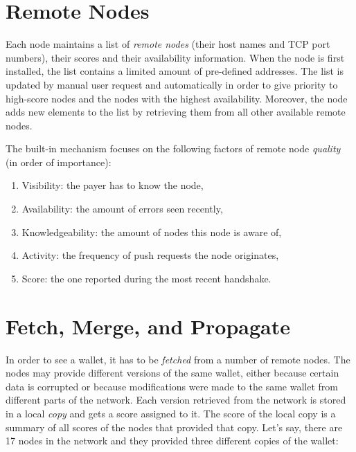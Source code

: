 \documentclass[11pt,oneside]{article}
\begin{document}
\section{Remote Nodes}\label{sec:remotes}

Each node maintains a list of \emph{remote nodes} (their host names and TCP port numbers),
their scores and their availability information. When the node is first installed,
the list contains a limited amount of pre-defined addresses. The list is
updated by manual user request and automatically in order to give priority
to high-score nodes and the nodes with the highest availability.
Moreover, the node adds new elements to the list by retrieving them from all other
available remote nodes.

The built-in mechanism focuses on the following factors of
remote node \emph{quality} (in order of importance):

\begin{enumerate}
  \item Visibility: the payer has to know the node,
  \item Availability: the amount of errors seen recently,
  \item Knowledgeability: the amount of nodes this node is aware of,
  \item Activity: the frequency of push requests the node originates,
  \item Score: the one reported during the most recent handshake.
\end{enumerate}

\section{Fetch, Merge, and Propagate}\label{sec:fetch}

In order to see a wallet, it has to be \emph{fetched} from a number of remote
nodes. The nodes may provide different versions of the same wallet, either
because certain data is corrupted or because modifications were made to the same
wallet from different parts of the network. Each version retrieved from the
network is stored in a local \emph{copy} and gets a score assigned to it.
The score of the local copy is a summary of all scores of the nodes that
provided that copy. Let's say, there are 17 nodes in the network and they
provided three different copies of the wallet:
\end{document}
